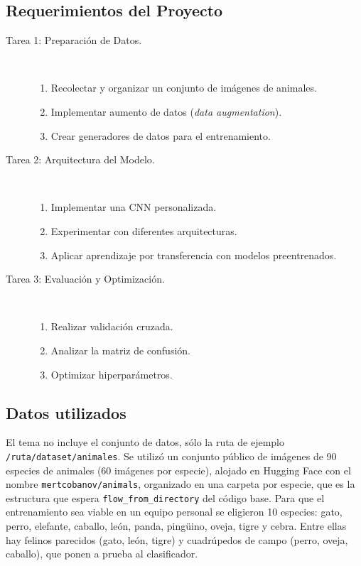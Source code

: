 \documentclass[11pt,letterpaper]{article}
\begin{document}
\subsection*{Requerimientos del Proyecto}

\begin{description}
    \item[Tarea 1: Preparación de Datos.]\mbox{}\\[-1.3\baselineskip]
    \begin{enumerate}
        \item Recolectar y organizar un conjunto de imágenes de animales.
        \item Implementar aumento de datos (\textit{data augmentation}).
        \item Crear generadores de datos para el entrenamiento.
    \end{enumerate}
    \item[Tarea 2: Arquitectura del Modelo.]\mbox{}\\[-1.3\baselineskip]
    \begin{enumerate}
        \item Implementar una CNN personalizada.
        \item Experimentar con diferentes arquitecturas.
        \item Aplicar aprendizaje por transferencia con modelos preentrenados.
    \end{enumerate}
    \item[Tarea 3: Evaluación y Optimización.]\mbox{}\\[-1.3\baselineskip]
    \begin{enumerate}
        \item Realizar validación cruzada.
        \item Analizar la matriz de confusión.
        \item Optimizar hiperparámetros.
    \end{enumerate}
\end{description}

\subsection*{Datos utilizados}

El tema no incluye el conjunto de datos, sólo la ruta de ejemplo \texttt{/ruta/dataset/animales}. Se utilizó un conjunto público de imágenes de 90 especies de animales (60 imágenes por especie), alojado en Hugging Face con el nombre \texttt{mertcobanov/animals}, organizado en una carpeta por especie, que es la estructura que espera \texttt{flow\_from\_directory} del código base. Para que el entrenamiento sea viable en un equipo personal se eligieron 10 especies: gato, perro, elefante, caballo, león, panda, pingüino, oveja, tigre y cebra. Entre ellas hay felinos parecidos (gato, león, tigre) y cuadrúpedos de campo (perro, oveja, caballo), que ponen a prueba al clasificador.
\end{document}
